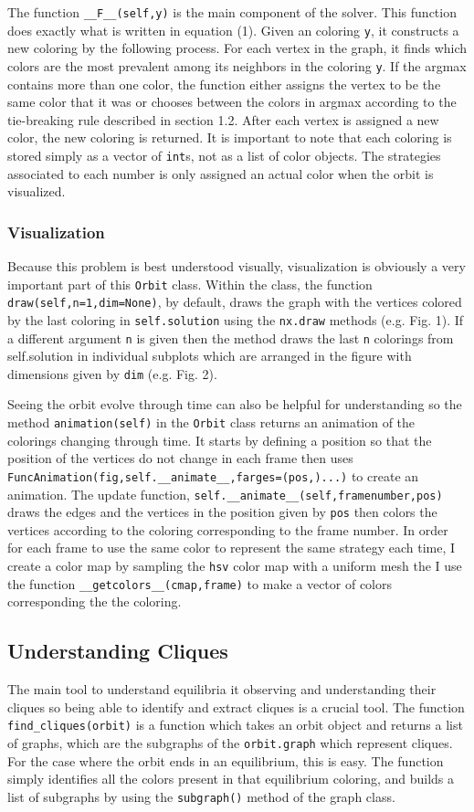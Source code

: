 \documentclass[]{article}
\begin{document}
The function \verb*|__F__(self,y)| is the main component of the solver. This function does exactly what is written in equation (1). Given an coloring \verb*|y|, it constructs a new coloring by the following process. For each vertex in the graph, it finds which colors are the most prevalent among its neighbors in the coloring \verb*|y|. If the argmax contains more than one color, the function either assigns the vertex to be the same color that it was or chooses between the colors in argmax according to the tie-breaking rule described in section 1.2. After each vertex is assigned a new color, the new coloring is returned. It is important to note that each coloring is stored simply as a vector of \verb*|int|s, not as a list of color objects. The strategies associated to each number is only assigned an actual color when the orbit is visualized.    
\subsubsection{Visualization}
Because this problem is best understood visually, visualization is obviously a very important part of this \verb*|Orbit| class. Within the class, the function \verb*|draw(self,n=1,dim=None)|, by default, draws the graph with the vertices colored by the last coloring in \verb*|self.solution| using the \verb*|nx.draw| methods (e.g. Fig. 1). If a different argument \verb*|n| is given then the method draws the last \verb*|n| colorings from self.solution in individual subplots which are arranged in the figure with dimensions given by \verb*|dim| (e.g. Fig. 2).

Seeing the orbit evolve through time can also be helpful for understanding so the method \verb*|animation(self)| in the \verb*|Orbit| class returns an animation of the colorings changing through time. It starts by defining a position so that the position of the vertices do not change in each frame then uses \verb*|FuncAnimation(fig,self.__animate__,farges=(pos,)...)| to create an animation.  The update function, \verb*|self.__animate__(self,framenumber,pos)| draws the edges and the vertices in the position given by \verb*|pos| then colors the vertices according to the coloring corresponding to the frame number. In order for each frame to use the same color to represent the same strategy each time, I create a color map by sampling the \verb*|hsv| color map with a uniform mesh the I use the function \verb*|__getcolors__(cmap,frame)| to make a vector of colors corresponding the the coloring. 
\subsection{Understanding Cliques}
The main tool to understand equilibria it observing and understanding their cliques so being able to identify and extract cliques is a crucial tool. The function \verb*|find_cliques(orbit)| is a function which takes an orbit object and returns a list of graphs, which are the subgraphs of the \verb*|orbit.graph| which represent cliques. For the case where the orbit ends in an equilibrium, this is easy. The function simply identifies all the colors present in that equilibrium coloring, and builds a list of subgraphs by using the \verb*|subgraph()| method of the graph class. 
\end{document}
